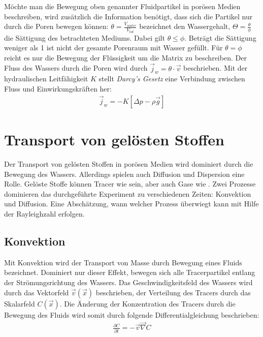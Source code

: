 Möchte man die Bewegung oben genannter Fluidpartikel in porösen Medien beschreiben, wird zusätzlich die Information benötigt, dass sich die Partikel nur durch die Poren bewegen können:
$\theta = \frac{V_{water}}{V_{tot}}$ bezeichnet den Wassergehalt, $\Theta = \frac{\theta}{\phi}$ die Sättigung des betrachteten Mediums. 
Dabei gilt $\theta \leq \phi$. Beträgt die Sättigung weniger als 1 ist nicht der gesamte Porenraum mit Wasser gefüllt. Für $\theta = \phi$ reicht es nur die
Bewegung der Flüssigkeit um die Matrix zu beschreiben. Der Fluss des Wassers durch die Poren wird durch $\vec{j}_w = \theta \cdot \vec{v}$ beschrieben. 
Mit der hydraulischen Leitfähigkeit $K$ stellt \textit{Darcy's Gesetz} eine Verbindung zwischen Fluss und Einwirkungskräften her:
\begin{align}
 \vec{j}_w = -K \left[ \Delta p - \rho \vec{g} \right]
 \label{darcy}
\end{align}


\section{Transport von gelösten Stoffen}
\label{sec:soltra}

Der Transport von gelösten Stoffen in porösen Medien wird dominiert durch die Bewegung des Wassers. Allerdings spielen auch Diffusion und Dispersion eine Rolle.
Gelöste Stoffe können Tracer wie \BCG sein, aber auch Gase wie \COT.
Zwei Prozesse dominieren das durchgeführte Experiment zu verschiedenen Zeiten: Konvektion und Diffusion. Eine Abschätzung, wann welcher Prozess überwiegt kann mit Hilfe der Rayleighzahl erfolgen.

\subsection{Konvektion}
\label{sec:conv}
Mit Konvektion wird der Transport von Masse durch Bewegung eines Fluids bezeichnet. Dominiert nur dieser Effekt, bewegen sich alle Tracerpartikel entlang der Strömungsrichtung des Wassers.
Das Geschwindigkeitsfeld des Wassers wird durch das Vektorfeld $\vec{v}(\vec{x})$ beschrieben, der Verteilung des Tracers durch das Skalarfeld $C(\vec{x})$. 
Die Änderung der Konzentration des Tracers durch die Bewegung des Fluids wird somit durch folgende Differentialgleichung beschrieben:
\begin{align}
 \frac{\partial C}{\partial t} = -\vec{v}\vec{\nabla}C
\end{align}


